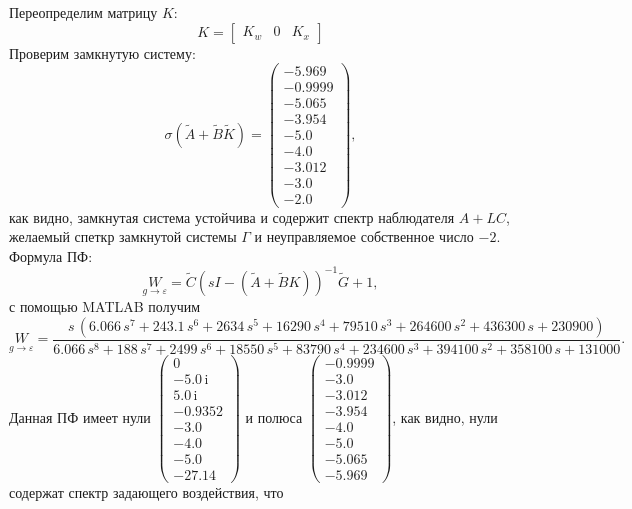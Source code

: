 Переопределим матрицу $K$:
\begin{equation*}
    K=\begin{bmatrix}
        K_w&0&K_x
    \end{bmatrix}
\end{equation*}
Проверим замкнутую систему:
\begin{equation*}
    \sigma(\tilde A+\tilde B\tilde K)=\left(\begin{array}{c}
-5.969\\
-0.9999\\
-5.065\\
-3.954\\
-5.0\\
-4.0\\
-3.012\\
-3.0\\
-2.0
\end{array}\right),
\end{equation*}
как видно, замкнутая система устойчива и содержит спектр наблюдателя $A+LC$, желаемый спеткр замкнутой системы $\Gamma$
и неуправляемое собственное число $-2$.
Формула ПФ:
\begin{equation*}
    \underset{g\rightarrow\varepsilon}{W}=\tilde C(sI-(\tilde A+\tilde BK))^{-1}\tilde G+1,
\end{equation*}
с помощью MATLAB получим
\begin{equation*}
    \underset{g\rightarrow\varepsilon}{W}=\frac{s\,{\left(6.066\,s^7 + 243.1\,s^6 + 2634\,s^5 + 16290\,s^4 + 79510\,s^3 + 264600\,s^2 + 436300\,s + 230900\right)}}{6.066\,s^8 + 188\,s^7 + 2499\,s^6 + 18550\,s^5 + 83790\,s^4 + 234600\,s^3 + 394100\,s^2 + 358100\,s + 131000}.
\end{equation*}
Данная ПФ имеет нули $\left(\begin{array}{c}
0\\
-5.0\,\mathrm{i}\\
5.0\,\mathrm{i}\\
-0.9352\\
-3.0\\
-4.0\\
-5.0\\
-27.14
\end{array}\right)$ и полюса $\left(\begin{array}{c}
-0.9999\\
-3.0\\
-3.012\\
-3.954\\
-4.0\\
-5.0\\
-5.065\\
-5.969
\end{array}\right)$, как видно, нули содержат спектр задающего воздействия, что 
